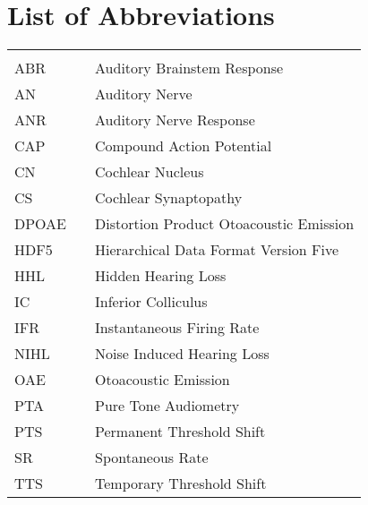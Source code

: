 
\tableofcontents
\cleardoublepage{}


\newpage
\listoffigures
\cleardoublepage{}

\chapter*{List of Abbreviations}
\begin{center}
  \begin{tabular}{lll}
    \hspace*{2em} & \hspace*{1in} & \hspace*{4.5in} \\
    ABR & \dotfill & Auditory Brainstem Response \\
    AN    & \dotfill & Auditory Nerve  \\
    ANR   & \dotfill & Auditory Nerve Response\\
    CAP  & \dotfill & Compound Action Potential \\ 
    CN    &  \dotfill & Cochlear Nucleus \\
    CS    & \dotfill & Cochlear Synaptopathy \\
    DPOAE & \dotfill & Distortion Product Otoacoustic Emission\\
    HDF5 & \dotfill & Hierarchical Data Format Version Five \\
    HHL & \dotfill & Hidden Hearing Loss \\ 
    IC 	& \dotfill & Inferior Colliculus \\
    IFR & \dotfill & Instantaneous Firing Rate \\
    NIHL & \dotfill & Noise Induced Hearing Loss\\
    OAE  & \dotfill & Otoacoustic Emission\\ 
    PTA & \dotfill & Pure Tone Audiometry \\
    PTS  & \dotfill & Permanent Threshold Shift\\
    SR    & \dotfill & Spontaneous Rate \\
    TTS & \dotfill & Temporary Threshold Shift\\
    
  \end{tabular}
\end{center}
\cleardoublepage{}


\newpage
\endofprelim{}
